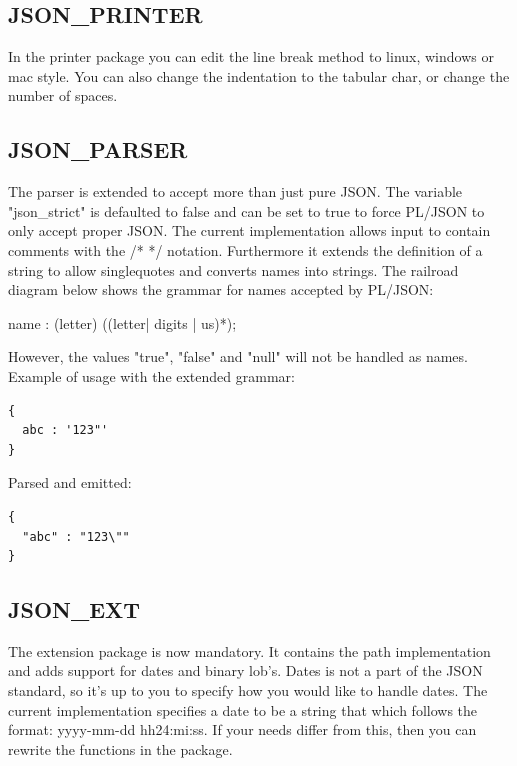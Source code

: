 \documentclass[11pt,a4paper]{article}
\begin{document}
\subsection*{JSON\_PRINTER}
In the printer package you can edit the line break method to linux, windows or mac style. You can also change the indentation to the tabular char, or change the number of spaces.

\subsection*{JSON\_PARSER}
The parser is extended to accept more than just pure JSON. The variable "json\_strict" is defaulted to false and can be set to true to force PL/JSON to only accept proper JSON. The current implementation allows input to contain comments with the /* */  notation. Furthermore it extends the definition of a string to allow singlequotes and converts names into strings. The railroad diagram below shows the grammar for names accepted by PL/JSON:
\begin{rail}
name     : (letter) ((letter| digits | us)*);
\end{rail}
However, the values "true", "false" and "null" will not be handled as names.\\
Example of usage with the extended grammar:
\begin{verbatim}
{
  abc : '123"'
}
\end{verbatim}
Parsed and emitted:
\begin{verbatim}
{
  "abc" : "123\""
}
\end{verbatim}

\subsection*{JSON\_EXT}
The extension package is now mandatory. It contains the path implementation and adds support for dates and binary lob's. Dates is not a part of the JSON standard, so it's up to you to specify how you would like to handle dates. The current implementation specifies a date to be a string that which follows the format: yyyy-mm-dd hh24:mi:ss. If your needs differ from this, then you can rewrite the functions in the package.
\end{document}
